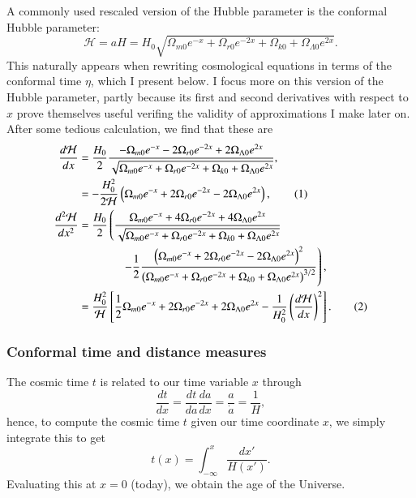\documentclass{aa}
\newcommand\numberthis{\addtocounter{equation}{1}\tag{\theequation}}
\numberwithin{equation}{section}
\numberwithin{table}{section}
\numberwithin{figure}{section}
\begin{document}
A commonly used rescaled version of the Hubble parameter is the conformal Hubble parameter:
\begin{equation}
    \mathcal{H} = aH = H_0 \sqrt{\Omega_{m0} e^{-x} + \Omega_{r0} e^{-2x} + \Omega_{k0} + \Omega_{\Lambda 0}e^{2x}}. \label{eq:Hp}
\end{equation}
This naturally appears when rewriting cosmological equations in terms of the conformal time $\eta$, which I present below. I focus more on this version of the Hubble parameter, partly because its first and second derivatives with respect to $x$ prove themselves useful verifing the validity of approximations I make later on. After some tedious calculation, we find that these are
\begin{align*}
    \frac{d\mathcal{H}}{dx} &= \frac{H_0}{2}
    \frac{-\Omega_{m0}e^{-x} - 2\Omega_{r0}e^{-2x} + 2\Omega_{\Lambda0}e^{2x}}
    {\sqrt{\Omega_{m0}e^{-x} 
    + \Omega_{r0}e^{-2x}
    + \Omega_{k0} + \Omega_{\Lambda0}e^{2x}}},
    \\
    &= -\frac{H_0^2}{2\mathcal{H}}\left(\Omega_{m0}e^{-x} + 2\Omega_{r0}e^{-2x} - 2\Omega_{\Lambda0}e^{2x}\right), \numberthis \label{eq:dHpdx}
    \\
    \frac{d^2\mathcal{H}}{dx^2} &= \frac{H_0}{2}
    \left(\frac{\Omega_{m0}e^{-x} + 4\Omega_{r0}e^{-2x} + 4\Omega_{\Lambda0}e^{2x}}{\sqrt{\Omega_{m0}e^{-x} + \Omega_{r0}e^{-2x} + \Omega_{k0} + \Omega_{\Lambda0}e^{2x}}}\right.
    \\
    &\hspace{38pt}
    \left.- \frac{1}{2}\frac{\left(\Omega_{m0}e^{-x} + 2\Omega_{r0}e^{-2x} - 2\Omega_{\Lambda0}e^{2x}\right)^2}{\left(\Omega_{m0}e^{-x} + \Omega_{r0}e^{-2x} + \Omega_{k0} + \Omega_{\Lambda0}e^{2x}\right)^{3/2}}\right),
    \\
    &= \frac{H_0^2}{\mathcal{H}}\left[\frac{1}{2}\Omega_{m0}e^{-x} + 2\Omega_{r0}e^{-2x} + 2\Omega_{\Lambda0}e^{2x}- \frac{1}{H_0^2}\left(\frac{d\mathcal{H}}{dx}\right)^2\right]. \numberthis \label{eq:ddHpddx}
\end{align*}



\subsubsection{Conformal time and distance measures}
The cosmic time $t$ is related to our time variable $x$ through
\begin{equation}
  \frac{dt}{dx} = \frac{dt}{da}\frac{da}{dx} = \frac{a}{\dot{a}} = \frac{1}{H},
\end{equation}
hence, to compute the cosmic time $t$ given our time coordinate $x$, we simply integrate this to get 
\begin{equation}
  t(x) = \int_{-\infty}^{x} \frac{dx'}{H(x')}.
\end{equation}
Evaluating this at $x=0$ (today), we obtain the age of the Universe.
\end{document}
